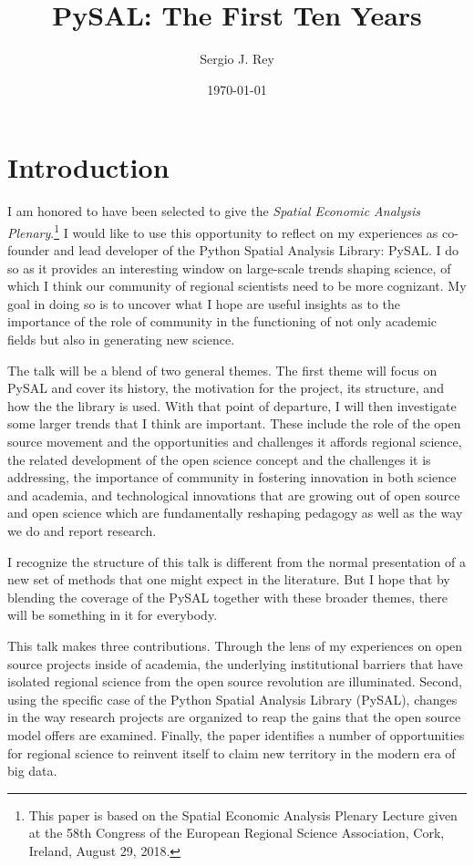 \documentclass[11pt]{article}
\author{Sergio J. Rey}
\date{\today}
\title{PySAL: The First Ten Years}
\begin{document}
\maketitle
\section*{Introduction}
\label{sec:org8a5fc20}

I am honored to have been selected to give the \emph{Spatial Economic Analysis
Plenary}.\footnote{This paper is based on the Spatial Economic Analysis Plenary Lecture
given at the 58th Congress of the European Regional Science Association, Cork,
Ireland, August 29, 2018.} I would like to use this opportunity to reflect on my experiences as
co-founder and lead developer of the Python Spatial Analysis Library: PySAL. I
do so as it provides an interesting window on large-scale trends shaping
science, of which I think our community of regional scientists need to be more
cognizant. My goal in doing so is to uncover what I hope are useful insights
as to the importance of the role of community in the functioning of not only
academic fields but also in generating new science.


The talk will be a blend of two general themes. The first theme will focus on
PySAL and cover its history, the motivation for the project, its structure, and
how the the library is used. With that point of departure, I will then
investigate some  larger trends that I think are important. These
include the role of the open source movement and the opportunities and
challenges it affords regional science, the related development of the open
science concept and the challenges it is addressing, the importance of
community in fostering innovation in both science and academia, and
technological innovations that are growing out of open source and open science
which are fundamentally reshaping pedagogy as well as the way we do and report
research.

I recognize the structure of this talk is different from the normal
presentation of a new set of methods that one might expect in the literature.
But I hope that by blending the coverage of the PySAL together with these
broader themes, there will be something in it for everybody.

This talk makes three contributions. Through the lens of my
experiences on open source projects inside of academia, the underlying
institutional barriers that have isolated regional science from the open source
revolution are illuminated. Second, using the specific case of the Python
Spatial Analysis Library (PySAL), changes in the way research projects are
organized to reap the gains that the open source model offers are examined.
Finally, the paper identifies a number of opportunities for regional science to
reinvent itself to claim new territory in the modern era of big data.
\end{document}
